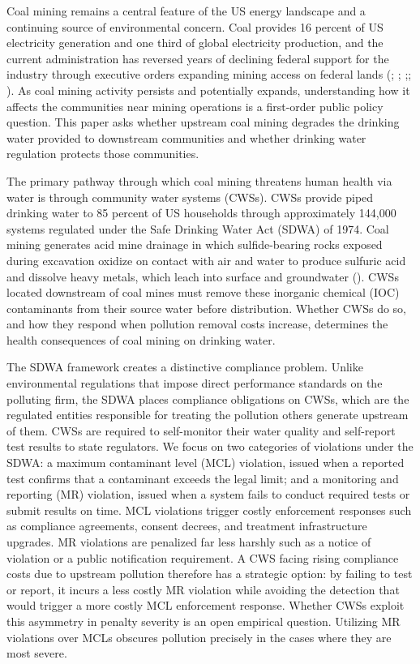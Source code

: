 \documentclass{article}
\begin{document}
Coal mining remains a central feature of the US energy landscape and a continuing source of environmental concern. Coal provides 16 percent of US electricity generation and one third of global electricity production, and the current administration has reversed years of declining federal support for the industry through executive orders expanding mining access on federal lands (\cite{IEA2025GER}; \cite{Trump2025EO14260}; \cite{Trump2025EO14261};\cite{Trump2025Proc10914}; \cite{Daly2025CoalMining}). As coal mining activity persists and potentially expands, understanding how it affects the communities near mining operations is a first-order public policy question. This paper asks whether upstream coal mining degrades the drinking water provided to downstream communities and whether drinking water regulation protects those communities.

The primary pathway through which coal mining threatens human health via water is through community water systems (CWSs). CWSs provide piped drinking water to 85 percent of US households through approximately 144,000 systems regulated under the Safe Drinking Water Act (SDWA) of 1974. Coal mining generates acid mine drainage in which sulfide-bearing rocks exposed during excavation oxidize on contact with air and water to produce sulfuric acid and dissolve heavy metals, which leach into surface and groundwater (\cite{skousen2019acid}). CWSs located downstream of coal mines must remove these inorganic chemical (IOC) contaminants from their source water before distribution. Whether CWSs do so, and how they respond when pollution removal costs increase, determines the health consequences of coal mining on drinking water.

The SDWA framework creates a distinctive compliance problem. Unlike environmental regulations that impose direct performance standards on the polluting firm, the SDWA places compliance obligations on CWSs, which are the regulated entities responsible for treating the pollution others generate upstream of them. CWSs are required to self-monitor their water quality and self-report test results to state regulators. We focus on two categories of violations under the SDWA: a maximum contaminant level (MCL) violation, issued when a reported test confirms that a contaminant exceeds the legal limit; and a monitoring and reporting (MR) violation, issued when a system fails to conduct required tests or submit results on time. MCL violations trigger costly enforcement responses such as compliance agreements, consent decrees, and treatment infrastructure upgrades. MR violations are penalized far less harshly such as a notice of violation or a public notification requirement. A CWS facing rising compliance costs due to upstream pollution therefore has a strategic option: by failing to test or report, it incurs a less costly MR violation while avoiding the detection that would trigger a more costly MCL enforcement response. Whether CWSs exploit this asymmetry in penalty severity is an open empirical question. Utilizing MR violations over MCLs obscures pollution precisely in the cases where they are most severe.
\end{document}
